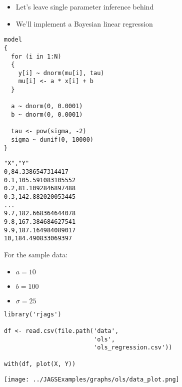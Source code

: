 \documentclass{beamer}
\begin{document}
\begin{frame}[fragile]
  \begin{itemize}
    \item{Let's leave single parameter inference behind}
    \item{We'll implement a Bayesian linear regression}
  \end{itemize}
\end{frame}

\begin{frame}[fragile]
  \begin{verbatim}
model
{
  for (i in 1:N)
  {
    y[i] ~ dnorm(mu[i], tau)
    mu[i] <- a * x[i] + b
  }
  
  a ~ dnorm(0, 0.0001)
  b ~ dnorm(0, 0.0001)
  
  tau <- pow(sigma, -2)
  sigma ~ dunif(0, 10000)
}
  \end{verbatim}
\end{frame}

\begin{frame}[fragile]
  \begin{verbatim}
"X","Y"
0,84.3386547314417
0.1,105.591083105552
0.2,81.1092846897488
0.3,142.882020053445
...
9.7,182.668364644078
9.8,167.384684627541
9.9,187.164984089017
10,184.490833069397
  \end{verbatim}
\end{frame}

\begin{frame}
  For the sample data:
  \begin{itemize}
    \item{$a = 10$}
    \item{$b = 100$}
    \item{$\sigma = 25$}
  \end{itemize}
\end{frame}

\begin{frame}[fragile]
  \begin{verbatim}
library('rjags')

df <- read.csv(file.path('data',
                         'ols',
                         'ols_regression.csv'))

with(df, plot(X, Y))
  \end{verbatim}
\end{frame}

\begin{frame}[fragile]
  \begin{center}
    \texttt{[image: ../JAGSExamples/graphs/ols/data\_plot.png]}
  \end{center}
\end{frame}
\end{document}
